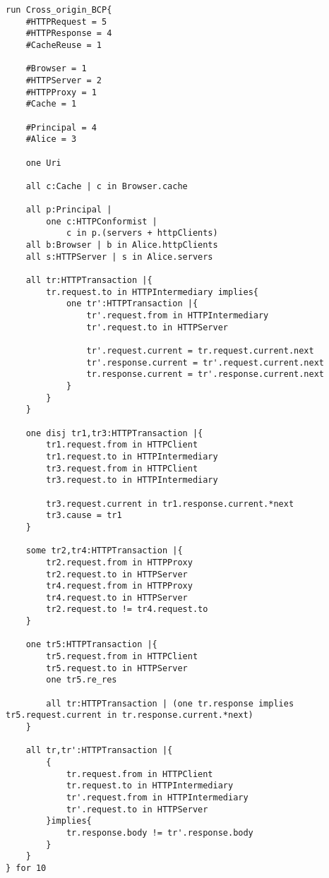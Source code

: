 \documentclass[12pt,a4paper]{jbook}
\begin{document}
\appendix
\begin{lstlisting}[caption=Cross-origin Browser Cache Poisoning攻撃の表現, label=code:Cross_origin_BCP]
run Cross_origin_BCP{
	#HTTPRequest = 5
	#HTTPResponse = 4
	#CacheReuse = 1

	#Browser = 1
	#HTTPServer = 2
	#HTTPProxy = 1
	#Cache = 1

	#Principal = 4
	#Alice = 3

	one Uri

	all c:Cache | c in Browser.cache

	all p:Principal |
		one c:HTTPConformist |
			c in p.(servers + httpClients)
	all b:Browser | b in Alice.httpClients
	all s:HTTPServer | s in Alice.servers

	all tr:HTTPTransaction |{
		tr.request.to in HTTPIntermediary implies{
			one tr':HTTPTransaction |{
				tr'.request.from in HTTPIntermediary
				tr'.request.to in HTTPServer

				tr'.request.current = tr.request.current.next
				tr'.response.current = tr'.request.current.next
				tr.response.current = tr'.response.current.next
			}
		}
	}
	
	one disj tr1,tr3:HTTPTransaction |{
		tr1.request.from in HTTPClient
		tr1.request.to in HTTPIntermediary
		tr3.request.from in HTTPClient
		tr3.request.to in HTTPIntermediary

		tr3.request.current in tr1.response.current.*next
		tr3.cause = tr1
	}

	some tr2,tr4:HTTPTransaction |{
		tr2.request.from in HTTPProxy
		tr2.request.to in HTTPServer
		tr4.request.from in HTTPProxy
		tr4.request.to in HTTPServer
		tr2.request.to != tr4.request.to
	}

	one tr5:HTTPTransaction |{
		tr5.request.from in HTTPClient
		tr5.request.to in HTTPServer
		one tr5.re_res

		all tr:HTTPTransaction | (one tr.response implies tr5.request.current in tr.response.current.*next)
	}

	all tr,tr':HTTPTransaction |{
		{
			tr.request.from in HTTPClient
			tr.request.to in HTTPIntermediary
			tr'.request.from in HTTPIntermediary
			tr'.request.to in HTTPServer
		}implies{
			tr.response.body != tr'.response.body
		}
	}
} for 10
\end{lstlisting}
\end{document}
